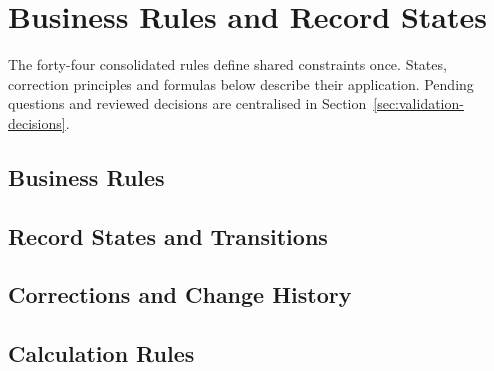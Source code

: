 \section{Business Rules and Record States}
\label{sec:business-rules}
The forty-four consolidated rules define shared constraints once.
States, correction principles and formulas below describe their application.
Pending questions and reviewed decisions are centralised in Section~\ref{sec:validation-decisions}.
\subsection{Business Rules}
\label{sec:business-rule-catalogue}

\subsection{Record States and Transitions}

\subsection{Corrections and Change History}
\label{sec:correction-principles}

\subsection{Calculation Rules}
\label{sec:calculation-rules}

